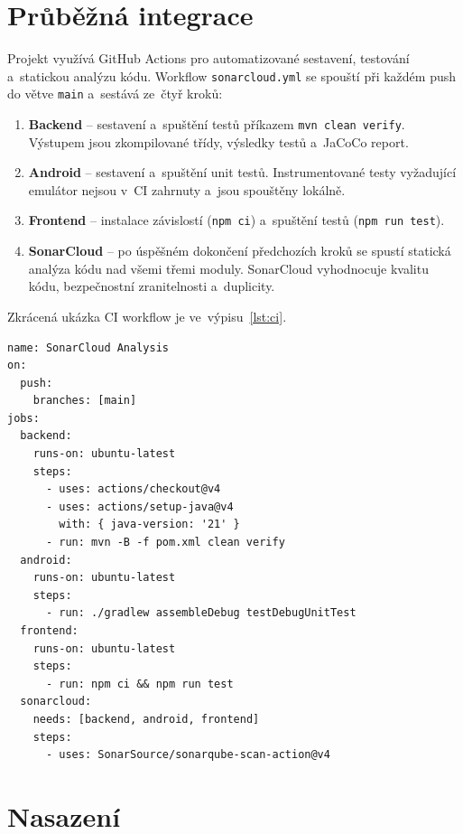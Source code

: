 \section{Průběžná integrace}

Projekt využívá GitHub Actions pro automatizované sestavení, testování a~statickou analýzu kódu. Workflow \texttt{sonarcloud.yml} se spouští při každém push do větve \texttt{main} a~sestává ze~čtyř kroků:

\begin{enumerate}
	\item \textbf{Backend} -- sestavení a~spuštění testů příkazem \texttt{mvn clean verify}. Výstupem jsou zkompilované třídy, výsledky testů a~JaCoCo report.
	\item \textbf{Android} -- sestavení a~spuštění unit testů. Instrumentované testy vyžadující emulátor nejsou v~CI zahrnuty a~jsou spouštěny lokálně.
	\item \textbf{Frontend} -- instalace závislostí (\texttt{npm ci}) a~spuštění testů (\texttt{npm run test}).
	\item \textbf{SonarCloud} -- po úspěšném dokončení předchozích kroků se spustí statická analýza kódu nad všemi třemi moduly. SonarCloud vyhodnocuje kvalitu kódu, bezpečnostní zranitelnosti a~duplicity.
\end{enumerate}

Zkrácená ukázka CI workflow je ve~výpisu~\ref{lst:ci}.

\begin{listing}[H]
\caption{GitHub Actions workflow pro průběžnou integraci (zkráceno)}\label{lst:ci}
\begin{verbatim}
name: SonarCloud Analysis
on:
  push:
    branches: [main]
jobs:
  backend:
    runs-on: ubuntu-latest
    steps:
      - uses: actions/checkout@v4
      - uses: actions/setup-java@v4
        with: { java-version: '21' }
      - run: mvn -B -f pom.xml clean verify
  android:
    runs-on: ubuntu-latest
    steps:
      - run: ./gradlew assembleDebug testDebugUnitTest
  frontend:
    runs-on: ubuntu-latest
    steps:
      - run: npm ci && npm run test
  sonarcloud:
    needs: [backend, android, frontend]
    steps:
      - uses: SonarSource/sonarqube-scan-action@v4
\end{verbatim}
\end{listing}

\section{Nasazení}

